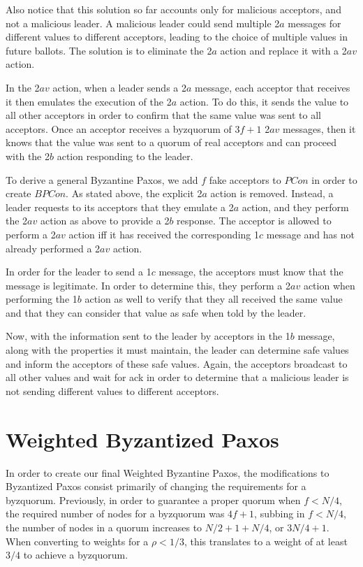 \documentclass[conference]{IEEEtran}
\begin{document}
Also notice that this solution so far accounts only for malicious acceptors, and not a malicious leader. A malicious leader could send multiple 2$a$ messages for different values to different acceptors, leading to the choice of multiple values in future ballots. The solution is to eliminate the 2$a$ action and replace it with a 2$av$ action.

In the 2$av$ action, when a leader sends a 2$a$ message, each acceptor that receives it then emulates the execution of the 2$a$ action. To do this, it sends the value to all other acceptors in order to confirm that the same value was sent to all acceptors. Once an acceptor receives a byzquorum of $3f + 1$ 2$av$ messages, then it knows that the value was sent to a quorum of real acceptors and can proceed with the 2$b$ action responding to the leader.
 
To derive a general Byzantine Paxos, we add $f$ fake acceptors to $PCon$ in order to create $BPCon$. As stated above, the explicit 2$a$ action is removed. Instead, a leader requests to its acceptors that they emulate a 2$a$ action, and they perform the 2$av$ action as above to provide a 2$b$ response. The acceptor is allowed to perform a 2$av$ action iff it has received the corresponding 1$c$ message and has not already performed a 2$av$ action.

In order for the leader to send a 1$c$ message, the acceptors must know that the message is legitimate. In order to determine this, they perform a 2$av$ action when performing the 1$b$ action as well to verify that they all received the same value and that they can consider that value as safe when told by the leader.

Now, with the information sent to the leader by acceptors in the 1$b$ message, along with the properties it must maintain, the leader can determine safe values and inform the acceptors of these safe values. Again, the acceptors broadcast to all other values and wait for ack in order to determine that a malicious leader is not sending different values to different acceptors.

\section{Weighted Byzantized Paxos}
In order to create our final Weighted Byzantine Paxos, the modifications to Byzantized Paxos consist primarily of changing the requirements for a byzquorum. Previously, in order to guarantee a proper quorum when $f < N/4$, the required number of nodes for a byzquorum was $4f+ 1$, subbing in $f < N/4$, the number of nodes in a quorum increases to $N/2 + 1 + N/4$, or $3N/4 + 1$. When converting to weights for a $\rho < 1/3$, this translates to a weight of at least $3/4$ to achieve a byzquorum.
\end{document}
